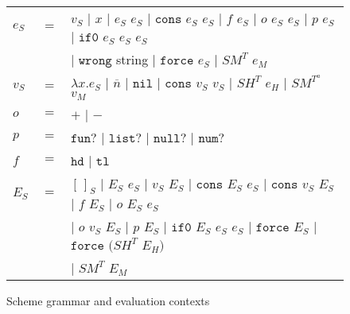 \begin{figure}[p]
\centering
\begin{tabular}{lcl}
\vspace{5pt}

$e_{S}$ & $=$ & $v_{S}$ $\vert$ $x$ $\vert$ $e_{S}$ $e_{S}$ $\vert$ $\mathtt{cons}$ $e_{S}$ $e_{S}$ $\vert$ $f$ $e_{S}$ $\vert$ $o$ $e_{S}$ $e_{S}$ $\vert$ $p$ $e_{S}$ $\vert$ $\mathtt{if0}$ $e_{S}$ $e_{S}$ $e_{S}$ \\

\vspace{5pt}

&& $\vert$ $\mathtt{wrong}$ string $\vert$ $\mathtt{force}$ $e_{S}$ $\vert$ $SM^{T}$ $e_{M}$ \\

\vspace{5pt}

$v_{S}$ & $=$ & $\lambda x.e_{S}$ $\vert$ $\overline{n}$ $\vert$ $\mathtt{nil}$ $\vert$ $\mathtt{cons}$ $v_{S}$ $v_{S}$ $\vert$ $SH^{T}$ $e_{H}$ $\vert$ $SM^{T^{a}}$ $v_{M}$ \\

\vspace{5pt}

$o$ & $=$ & $+$ $\vert$ $-$ \\

\vspace{5pt}

$p$ & $=$ & $\mathtt{fun?}$ $\vert$ $\mathtt{list?}$ $\vert$ $\mathtt{null?}$ $\vert$ $\mathtt{num?}$ \\

\vspace{5pt}

$f$ & $=$ & $\mathtt{hd}$ $\vert$ $\mathtt{tl}$ \\

\vspace{5pt}

$E_{S}$ & $=$ & $[\,]_{S}$ $\vert$ $E_{S}$ $e_{S}$ $\vert$ $v_{S}$ $E_{S}$ $\vert$ $\mathtt{cons}$ $E_{S}$ $e_{S}$ $\vert$ $\mathtt{cons}$ $v_{S}$ $E_{S}$ $\vert$ $f$ $E_{S}$ $\vert$ $o$ $E_{S}$ $e_{S}$ \\

\vspace{5pt}

&& $\vert$ $o$ $v_{S}$ $E_{S}$ $\vert$ $p$ $E_{S}$ $\vert$ $\mathtt{if0}$ $E_{S}$ $e_{S}$ $e_{S}$ $\vert$ $\mathtt{force}$ $E_{S}$ $\vert$ $\mathtt{force}$ $(SH^{T}$ $E_{H})$ \\

&& $\vert$ $SM^{T}$ $E_{M}$
\end{tabular}
\caption{Scheme grammar and evaluation contexts}
\label{sg}
\end{figure}